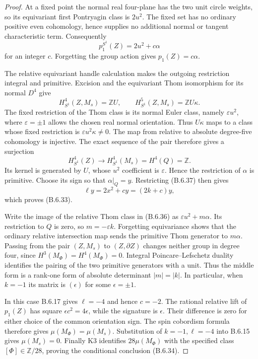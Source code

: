 \begin{proof}
At a fixed point the normal real four-plane has the two
unit circle weights, so its equivariant first Pontryagin
class is $2u^2$.  The fixed set has no ordinary positive
even cohomology, hence supplies no additional normal
or tangent characteristic term.  Consequently
\[
                   p_1^{S^1}(Z)=2u^2+c\alpha
 \tag{B.6.37}
\]
for an integer $c$.  Forgetting the group action gives
$p_1(Z)=c\alpha$.

The relative equivariant handle calculation makes the
outgoing restriction integral and primitive.  Excision
and the equivariant Thom isomorphism for its normal
$D^4$ give
\[
 H^4_{S^1}(Z,M_s)=\mathbb ZU,\qquad
 H^5_{S^1}(Z,M_s)=\mathbb ZU\kappa.
\]
The fixed restriction of the Thom class is its normal
Euler class, namely $\varepsilon u^2$, where
$\varepsilon=\pm1$ allows the chosen real normal
orientation.  Thus $U\kappa$ maps to a class whose
fixed restriction is $\varepsilon u^2\kappa\ne0$.
The map from relative to absolute degree-five
cohomology is injective.  The exact sequence of the
pair therefore gives a surjection
\[
 H^4_{S^1}(Z)\longrightarrow H^4_{S^1}(M_s)
                                  =H^4(Q)=\mathbb Z.
\]
Its kernel is generated by $U$, whose $u^2$ coefficient
is $\varepsilon$.  Hence the restriction of $\alpha$
is primitive.  Choose its sign so that
$\alpha|_Q=y$.  Restricting (B.6.37) then gives
\[
                    \ell y=2x^2+cy=(2k+c)y,
\]
which proves (B.6.33).

Write the image of the relative Thom class in (B.6.36)
as $\varepsilon u^2+m\alpha$.  Its restriction to $Q$
is zero, so $m=-\varepsilon k$.  Forgetting equivariance
shows that the ordinary relative intersection map sends
the primitive Thom generator to $m\alpha$.  Passing
from the pair $(Z,M_s)$ to $(Z,\partial Z)$ changes
neither group in degree four, since
$H^3(M_\Phi)=H^4(M_\Phi)=0$.  Integral
Poincare--Lefschetz duality identifies the pairing of
the two primitive generators with a unit.  Thus the
middle form is a rank-one form of absolute determinant
$|m|=|k|$.  In particular, when $k=-1$ its matrix is
$(\epsilon)$ for some $\epsilon=\pm1$.

In this case B.6.17 gives $\ell=-4$ and hence $c=-2$.
The rational relative lift of $p_1(Z)$ has square
$\epsilon c^2=4\epsilon$, while the signature is
$\epsilon$.  Their difference is zero for either
choice of the common orientation sign.  The spin
cobordism formula therefore gives
$\mu(M_\Phi)=\mu(M_s)$.  Substitution of
$k=-1,\ell=-4$ into B.6.15 gives $\mu(M_s)=0$.
Finally K3 identifies $28\mu(M_\Phi)$ with the
specified class $[\Phi]\in\mathbb Z/28$, proving
the conditional conclusion (B.6.34).
\end{proof}

